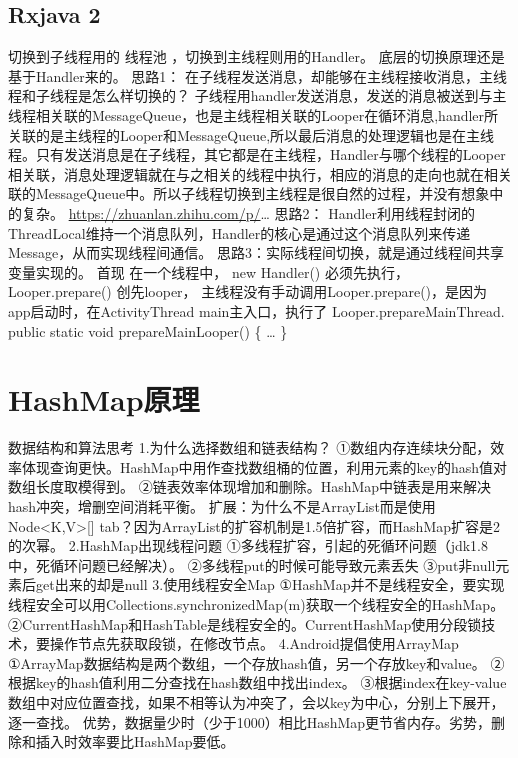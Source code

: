 \documentclass[9pt, b5paper]{article}
\begin{document}
\subsection{Rxjava 2}
\label{sec-10-2}
切换到子线程用的 线程池 ，切换到主线程则用的Handler。
底层的切换原理还是基于Handler来的。
思路1：
在子线程发送消息，却能够在主线程接收消息，主线程和子线程是怎么样切换的？
子线程用handler发送消息，发送的消息被送到与主线程相关联的MessageQueue，也是主线程相关联的Looper在循环消息,handler所关联的是主线程的Looper和MessageQueue,所以最后消息的处理逻辑也是在主线程。只有发送消息是在子线程，其它都是在主线程，Handler与哪个线程的Looper相关联，消息处理逻辑就在与之相关的线程中执行，相应的消息的走向也就在相关联的MessageQueue中。所以子线程切换到主线程是很自然的过程，并没有想象中的复杂。
\url{https://zhuanlan.zhihu.com/p/}\ldots{}
思路2：
Handler利用线程封闭的ThreadLocal维持一个消息队列，Handler的核心是通过这个消息队列来传递Message，从而实现线程间通信。
思路3：实际线程间切换，就是通过线程间共享变量实现的。
首现 在一个线程中， new Handler() 必须先执行，Looper.prepare() 创先looper，
主线程没有手动调用Looper.prepare()，是因为 app启动时，在ActivityThread main主入口，执行了 Looper.prepareMainThread.
public static void prepareMainLooper() \{ \ldots{} \}
\section{HashMap原理}
\label{sec-11}
数据结构和算法思考
1.为什么选择数组和链表结构？
①数组内存连续块分配，效率体现查询更快。HashMap中用作查找数组桶的位置，利用元素的key的hash值对数组长度取模得到。
②链表效率体现增加和删除。HashMap中链表是用来解决hash冲突，增删空间消耗平衡。
扩展：为什么不是ArrayList而是使用Node<K,V>[] tab？因为ArrayList的扩容机制是1.5倍扩容，而HashMap扩容是2的次幂。
2.HashMap出现线程问题
①多线程扩容，引起的死循环问题（jdk1.8中，死循环问题已经解决）。
②多线程put的时候可能导致元素丢失
③put非null元素后get出来的却是null
3.使用线程安全Map
①HashMap并不是线程安全，要实现线程安全可以用Collections.synchronizedMap(m)获取一个线程安全的HashMap。
②CurrentHashMap和HashTable是线程安全的。CurrentHashMap使用分段锁技术，要操作节点先获取段锁，在修改节点。
4.Android提倡使用ArrayMap
①ArrayMap数据结构是两个数组，一个存放hash值，另一个存放key和value。
②根据key的hash值利用二分查找在hash数组中找出index。
③根据index在key-value数组中对应位置查找，如果不相等认为冲突了，会以key为中心，分别上下展开，逐一查找。
优势，数据量少时（少于1000）相比HashMap更节省内存。劣势，删除和插入时效率要比HashMap要低。
\end{document}
